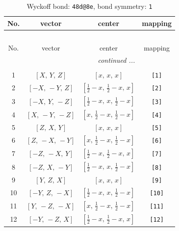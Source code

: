 \documentclass[fleqn,8pt]{jsarticle}
\begin{document}
\begin{longtable}{cccc}
\caption{Wyckoff bond: {\tt 48d@8e}, bond symmetry: {\tt 1}}
 \\
 \hline \hline
No. & vector & center & mapping \\ \hline \endfirsthead

\multicolumn{3}{l}{\tablename\ \thetable{}} \\
 \hline \hline
No. & vector & center & mapping \\ \hline \endhead

 \hline \hline
\multicolumn{3}{r}{\footnotesize\it continued ...} \\ \endfoot

 \hline \hline
\multicolumn{3}{r}{} \\ \endlastfoot

1 & $\left[ X,\, Y,\, Z \right]$ & $\left[ x,\, x,\, x \right]$ & {\tt [1]} \\ \hline
2 & $\left[ - X,\, - Y,\, Z \right]$ & $\left[ \frac{1}{2} - x,\, \frac{1}{2} - x,\, x \right]$ & {\tt [2]} \\ \hline
3 & $\left[ - X,\, Y,\, - Z \right]$ & $\left[ \frac{1}{2} - x,\, x,\, \frac{1}{2} - x \right]$ & {\tt [3]} \\ \hline
4 & $\left[ X,\, - Y,\, - Z \right]$ & $\left[ x,\, \frac{1}{2} - x,\, \frac{1}{2} - x \right]$ & {\tt [4]} \\ \hline
5 & $\left[ Z,\, X,\, Y \right]$ & $\left[ x,\, x,\, x \right]$ & {\tt [5]} \\ \hline
6 & $\left[ Z,\, - X,\, - Y \right]$ & $\left[ x,\, \frac{1}{2} - x,\, \frac{1}{2} - x \right]$ & {\tt [6]} \\ \hline
7 & $\left[ - Z,\, - X,\, Y \right]$ & $\left[ \frac{1}{2} - x,\, \frac{1}{2} - x,\, x \right]$ & {\tt [7]} \\ \hline
8 & $\left[ - Z,\, X,\, - Y \right]$ & $\left[ \frac{1}{2} - x,\, x,\, \frac{1}{2} - x \right]$ & {\tt [8]} \\ \hline
9 & $\left[ Y,\, Z,\, X \right]$ & $\left[ x,\, x,\, x \right]$ & {\tt [9]} \\ \hline
10 & $\left[ - Y,\, Z,\, - X \right]$ & $\left[ \frac{1}{2} - x,\, x,\, \frac{1}{2} - x \right]$ & {\tt [10]} \\ \hline
11 & $\left[ Y,\, - Z,\, - X \right]$ & $\left[ x,\, \frac{1}{2} - x,\, \frac{1}{2} - x \right]$ & {\tt [11]} \\ \hline
12 & $\left[ - Y,\, - Z,\, X \right]$ & $\left[ \frac{1}{2} - x,\, \frac{1}{2} - x,\, x \right]$ & {\tt [12]} \\ \hline

\end{longtable}
\end{document}
